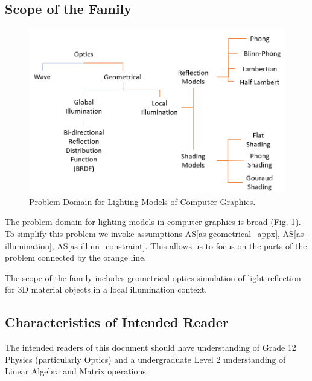 \documentclass[12pt]{article}
\newcommand{\aSref}[1]{AS\ref{#1}}
\begin{document}
\subsection{Scope of the Family} \label{sec_problem_definition}
\begin{figure}[h]
	\centering
	\includegraphics[scale=0.5]{./images/problem-domain-analysis}
	\caption{Problem Domain for Lighting Models of Computer Graphics.}
	\label{fig:prob-domain-analysis}
\end{figure}

The problem domain for lighting models in computer graphics is broad (Fig. 
\ref{fig:prob-domain-analysis}). To simplify this problem we invoke assumptions 
\aSref{as-geometrical_appx}, \aSref{as-illumination}, 
\aSref{as-illum_constraint}. This 
allows us to focus on the parts of the problem connected by the orange line.

The scope of the family includes geometrical optics simulation of light 
reflection for 3D material objects in a local illumination context.


\subsection{Characteristics of Intended Reader}
The intended readers of this document should have understanding of Grade 12 
Physics (particularly Optics) and a undergraduate Level 2 understanding of 
Linear Algebra and Matrix operations.  
\end{document}
